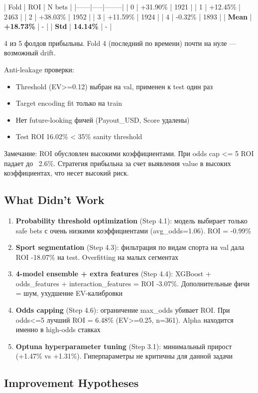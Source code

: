 \documentclass[12pt,a4paper]{article}
\begin{document}
| Fold | ROI | N bets |
|------|-----|--------|
| 0 | +31.90\% | 1921 |
| 1 | +12.45\% | 2463 |
| 2 | +38.03\% | 1952 |
| 3 | +11.59\% | 1924 |
| 4 | -0.32\% | 1893 |
| \textbf{Mean} | \textbf{+18.73\%} | - |
| \textbf{Std} | \textbf{14.14\%} | - |

4 из 5 фолдов прибыльны. Fold 4 (последний по времени) почти на нуле — возможный drift.

Anti-leakage проверки:
\begin{itemize}
  \item Threshold (EV>=0.12) выбран на val, применен к test один раз
  \item Target encoding fit только на train
  \item Нет future-looking фичей (Payout\_USD, Score удалены)
  \item Test ROI 16.02\% < 35\% sanity threshold
\end{itemize}

Замечание: ROI обусловлен высокими коэффициентами. При odds cap <= 5 ROI падает до ~2.6\%. Стратегия прибыльна за счет выявления value в высоких коэффициентах, что несет высокий риск.

\subsection{What Didn't Work}
\begin{enumerate}
  \item \textbf{Probability threshold optimization} (Step 4.1): модель выбирает только safe bets с очень низкими коэффициентами (avg\_odds=1.06). ROI = -0.99\%
  \item \textbf{Sport segmentation} (Step 4.3): фильтрация по видам спорта на val дала ROI -18.07\% на test. Overfitting на малых сегментах
  \item \textbf{4-model ensemble + extra features} (Step 4.4): XGBoost + odds\_features + interaction\_features = ROI -3.07\%. Дополнительные фичи = шум, ухудшение EV-калибровки
  \item \textbf{Odds capping} (Step 4.6): ограничение max\_odds убивает ROI. При odds<=5 лучший ROI = 6.48\% (EV>=0.25, n=361). Alpha находится именно в high-odds ставках
  \item \textbf{Optuna hyperparameter tuning} (Step 3.1): минимальный прирост (+1.47\% vs +1.31\%). Гиперпараметры не критичны для данной задачи
\end{enumerate}




\subsection{Improvement Hypotheses}
\end{document}
